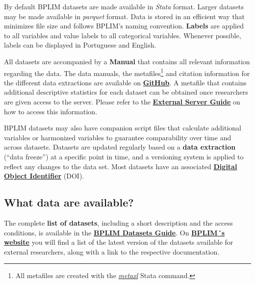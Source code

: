 \documentclass[
  a4paper,
  DIV=11,
  numbers=noendperiod]{scrartcl}
\begin{document}
By default BPLIM datasets are made available in \emph{Stata} format.
Larger datasets may be made available in \emph{parquet} format. Data is
stored in an efficient way that minimizes file size and follows BPLIM's
naming convention. \textbf{Labels} are applied to all variables and
value labels to all categorical variables. Whenever possible, labels can
be displayed in Portuguese and English.

All datasets are accompanied by a \textbf{Manual} that contains all
relevant information regarding the data. The data manuals, the
metafiles\footnote{All metafiles are created with the
  \href{https://github.com/BPLIM/Tools/tree/master/ados/General/metaxl}{\emph{metaxl}}
  Stata command.} and citation information for the different data
extractions are available on
\href{https://github.com/BPLIM/Manuals/tree/master/Data}{\textbf{GitHub}}.
A metafile that contains additional descriptive statistics for each
dataset can be obtained once researchers are given access to the server.
Please refer to the
\href{https://github.com/BPLIM/Manuals/tree/master/Guides/03_External_Server}{\textbf{External
Server Guide}} on how to access this information.

BPLIM datasets may also have companion script files that calculate
additional variables or harmonized variables to guarantee comparability
over time and across datasets. Datasets are updated regularly based on a
\textbf{data extraction} (``data freeze'') at a specific point in time,
and a versioning system is applied to reflect any changes to the data
set. Most datasets have an associated
\href{https://www.da-ra.de/dara/search/search_result?lang=en\&detail=false\&mdlang=en\&personal=false\&dsquery=BPLIM}{\textbf{Digital
Object Identifier}} (DOI).

\hypertarget{what-data-are-available}{%
\subsection{What data are available?}\label{what-data-are-available}}

The complete \textbf{list of datasets}, including a short description
and the access conditions, is available in the
\href{https://github.com/BPLIM/Manuals/tree/master/Guides/02_BPLIM_Datasets_Guide}{\textbf{BPLIM
Datasets Guide}}. On
\href{https://msites-dee-bplim-prd.azurewebsites.net}{\textbf{BPLIM´s
website}} you will find a list of the latest version of the datasets
available for external researchers, along with a link to the respective
documentation.
\end{document}
